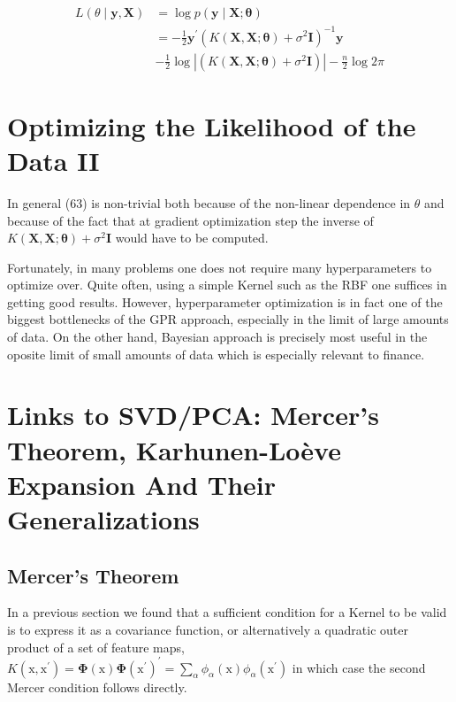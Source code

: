 \documentclass[11pt]{article}
\theoremstyle{plain} %
\theoremstyle{remark}
\begin{document}
$$
\begin{aligned}
L(\theta \mid \mathbf{y}, \mathbf{X}) & =\log p(\mathbf{y} \mid \mathbf{X} ; \boldsymbol{\theta}) \\
& =-\frac{1}{2} \mathbf{y}^{\prime}\left(K(\mathbf{X}, \mathbf{X} ; \boldsymbol{\theta})+\sigma^{2} \mathbf{I}\right)^{-1} \mathbf{y} \\
& -\frac{1}{2} \log \left|\left(K(\mathbf{X}, \mathbf{X} ; \boldsymbol{\theta})+\sigma^{2} \mathbf{I}\right)\right|-\frac{n}{2} \log 2 \pi
\end{aligned}
$$

\section*{Optimizing the Likelihood of the Data II}
In general (63) is non-trivial both because of the non-linear dependence in
$\theta$ and because of the fact that at gradient optimization step the inverse
of $K(\mathbf{X}, \mathbf{X} ; \boldsymbol{\theta})+\sigma^{2} \mathbf{I}$ would
have to be computed.

Fortunately, in many problems one does not require many hyperparameters to
optimize over. Quite often, using a simple Kernel such as the RBF one suffices
in getting good results. However, hyperparameter optimization is in fact one of
the biggest bottlenecks of the GPR approach, especially in the limit of large
amounts of data. On the other hand, Bayesian approach is precisely most useful
in the oposite limit of small amounts of data which is especially relevant to
finance.

\section{Links to SVD/PCA: Mercer's Theorem, Karhunen-Loève Expansion And Their Generalizations}
\subsection{Mercer's Theorem}
In a previous section we found that a sufficient condition for a Kernel to be
valid is to express it as a covariance function, or alternatively a quadratic
outer product of a set of feature maps, $K\left(\mathrm{x},
\mathrm{x}^{\prime}\right)=\boldsymbol{\Phi}(\mathrm{x})
\boldsymbol{\Phi}\left(\mathrm{x}^{\prime}\right)^{\prime}=\sum_{\alpha}
\phi_{\alpha}(\mathrm{x}) \phi_{\alpha}\left(\mathrm{x}^{\prime}\right)$ in
which case the second Mercer condition follows directly.
\end{document}
